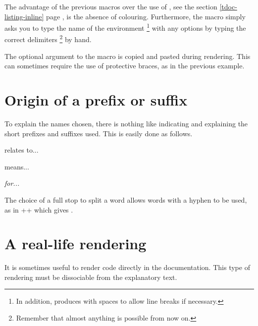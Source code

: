 \begin{tdocrem}
    The advantage of the previous macros over the use of , see the section \ref{tdoc-listing-inline} page \pageref{tdoc-listing-inline}, is the absence of colouring.
    Furthermore, the  macro simply asks you to type the name of the environment
    \footnote{
        In addition,  produces  with spaces to allow line breaks if necessary.
    }
    with any options by typing the correct delimiters
    \footnote{
        Remember that almost anything is possible from now on.
    }
    by hand.
\end{tdocrem}


\begin{tdocwarn}
    The optional argument to the  macro is copied and pasted during rendering. This can sometimes require the use of protective braces, as in the previous example.
\end{tdocwarn}



\section{Origin of a prefix or suffix}

To explain the names chosen, there is nothing like indicating and explaining the short prefixes and suffixes used. This is easily done as follows.


\begin{tdoclatex}[sbs]
 relates to...

 means...

\emph{ for...}
\end{tdoclatex}


\begin{tdocrem}
    The choice of a full stop to split a word allows words with a hyphen to be used, as in \tdocinlatex++ which gives .
\end{tdocrem}


\section{A real-life rendering} \label{tdoc-showcase}

It is sometimes useful to render code directly in the documentation. This type of rendering must be dissociable from the explanatory text.



